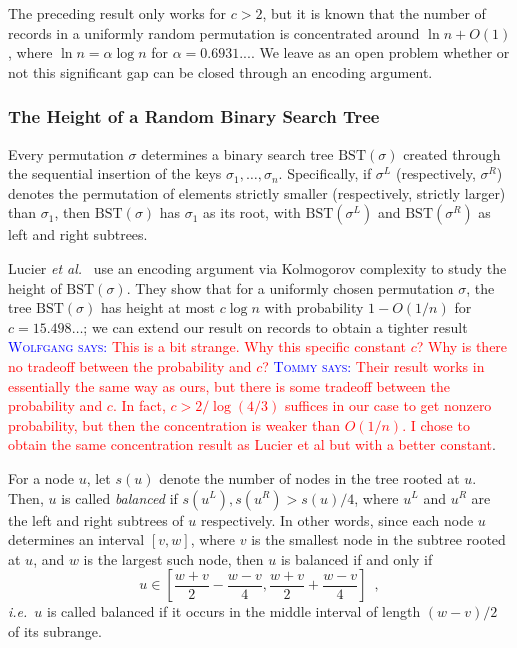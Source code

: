 \documentclass{patmorin}
\newcommand{\aremark}[3]{\textcolor{blue}{\textsc{#1 #2:}}
  \textcolor{red}{\textsf{#3}}}
\newcommand{\tommy}[2][says]{\aremark{Tommy}{#1}{#2}}
\newcommand{\wolfgang}[2][says]{\aremark{Wolfgang}{#1}{#2}}
\begin{document}
\begin{rem}
  The preceding result only works for $c > 2$, but it is  known
  that the number of records in a uniformly random permutation is
  concentrated around $\ln n + O(1)$, where $\ln n = \alpha \log n$
  for $\alpha = 0.6931...$. We leave as an open problem whether or not
  this significant gap can be closed through an encoding argument.
\end{rem}

\subsubsection{The Height of a Random Binary Search Tree}

Every permutation $\sigma$ determines a binary search tree
$\text{BST}(\sigma)$ created through the sequential insertion of the
keys $\sigma_1, \ldots, \sigma_n$. Specifically, if $\sigma^L$
(respectively, $\sigma^R$) denotes the permutation of elements
strictly smaller (respectively, strictly larger) than $\sigma_1$, then
$\text{BST}(\sigma)$ has $\sigma_1$ as its root, with
$\text{BST}(\sigma^L)$ and $\text{BST}(\sigma^R)$ as left and right
subtrees.

Lucier \emph{et al.}~\cite{lucier.jiang.li:quicksort} use an encoding
argument via Kolmogorov complexity to study the height of
$\text{BST}(\sigma)$. They show that for a uniformly chosen
permutation $\sigma$, the tree $\text{BST}(\sigma)$ has height at most
$c \log n$ with probability $1 - O(1/n)$ for $c = 15.498\dots$; we can
extend our result on records to obtain a tighter result \wolfgang{This
  is a bit strange. Why this specific constant $c$? Why is there no
  tradeoff between the probability and $c$?} \tommy{Their result works
  in essentially the same way as ours, but there is some tradeoff
  between the probability and $c$. In fact, $c > 2/\log(4/3)$ suffices
  in our case to get nonzero probability, but then the concentration
  is weaker than $O(1/n)$. I chose to obtain the same concentration
  result as Lucier et al but with a better constant}.

For a node $u$, let $s(u)$ denote the number of nodes in the tree
rooted at $u$. Then, $u$ is called \emph{balanced} if
$s(u^L), s(u^R) > s(u)/4$, where $u^L$ and $u^R$ are the left and
right subtrees of $u$ respectively. In other words, since each node
$u$ determines an interval $[v, w]$, where $v$ is the smallest node in
the subtree rooted at $u$, and $w$ is the largest such node, then $u$
is balanced if and only if
\[
  u \in \left[\frac{w + v}{2} - \frac{w - v}{4}, \frac{w + v}{2} + \frac{w - v}{4}\right] \enspace ,
\]
\emph{i.e.}~$u$ is called balanced if it occurs in the middle interval
of length $(w - v)/2$ of its subrange.
\end{document}
